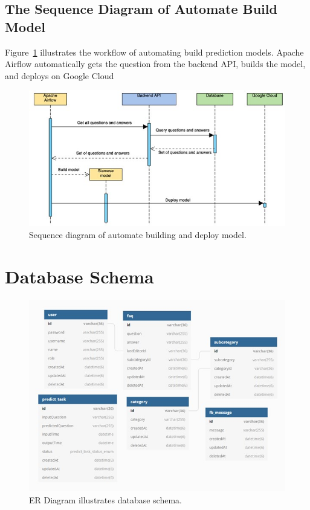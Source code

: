 \documentclass[12pt,oneside,openright,a4paper]{cpe-english-project}
\begin{document}
\pagebreak

\subsection{The Sequence Diagram of Automate Build Model}
Figure~\ref*{fig:Sequence diagram of automate building and deploy model} illustrates the workflow of automating build prediction models. Apache Airflow automatically gets the question from the backend API, builds the model, and deploys on Google Cloud
\begin{figure}[!h]
	\includegraphics[width=14cm]{img/ch3/sequence diagram of automate build model.jpg}
	\caption{Sequence diagram of automate building and deploy model.}\label{fig:Sequence diagram of automate building and deploy model}
\end{figure}

\section{Database Schema}
\begin{figure}[!h]
	\includegraphics[width=14cm]{img/ch3/Database Schema.jpg}
	\caption{ER Diagram illustrates database schema.}\label{fig:ER Diagram illustrates database schema}
\end{figure}
\end{document}
